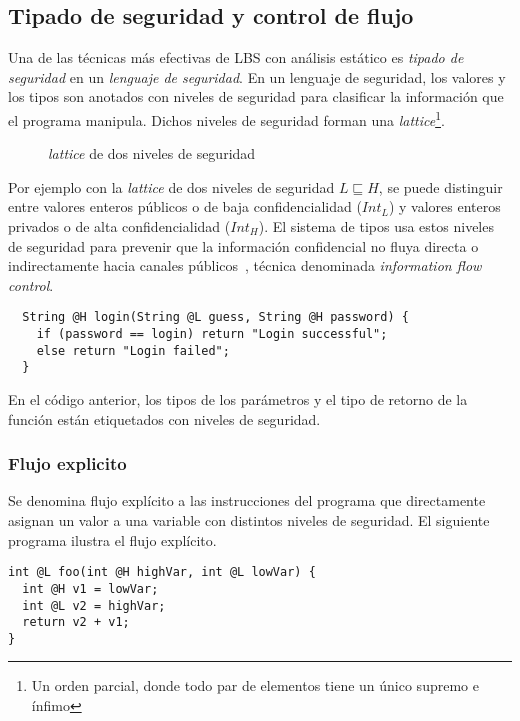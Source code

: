 \subsection{Tipado de seguridad y control de flujo} \label{sectype}
Una de las técnicas más efectivas de LBS con análisis estático es \textit{tipado de seguridad} en un \textit{lenguaje de seguridad}. En un lenguaje de seguridad, los valores y los tipos son anotados con niveles de seguridad para clasificar la información que el programa manipula. Dichos niveles de seguridad forman una \textit{lattice}\footnote{Un orden parcial, donde todo par de elementos tiene un único supremo e ínfimo}.

	\begin{figure}[ht]
		\centering
		\caption{\textit{lattice} de dos niveles de seguridad}
	\end{figure}


  	Por ejemplo con la \textit{lattice} de dos niveles de seguridad $L \sqsubseteq H$, se puede distinguir entre valores enteros públicos o de baja confidencialidad ($Int_L$) y valores enteros privados o de alta confidencialidad ($Int_H$). El sistema de tipos usa estos niveles de seguridad para prevenir que la información confidencial no fluya directa o indirectamente hacia canales públicos~\cite{volpanoAl:S96}, técnica denominada \textit{information flow control}.

  	\begin{lstlisting}
  String @H login(String @L guess, String @H password) {
  	if (password == login) return "Login successful";
  	else return "Login failed";
  }
  	\end{lstlisting}

    En el código anterior, los tipos de los parámetros y el tipo de retorno de la función están etiquetados con niveles de seguridad.

\subsubsection{Flujo explicito}
Se denomina flujo explícito a las instrucciones del programa que directamente asignan un valor a una variable con distintos niveles de seguridad. El siguiente programa ilustra el flujo explícito.

\begin{lstlisting}
int @L foo(int @H highVar, int @L lowVar) {
  int @H v1 = lowVar;
  int @L v2 = highVar;
  return v2 + v1;
}
\end{lstlisting}

